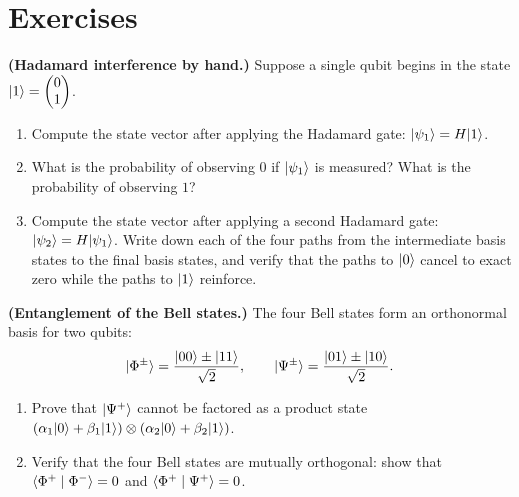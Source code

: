 \section*{Exercises}

\begin{exercise}\label{ch42:ex-hadamard-trace}
\textbf{(Hadamard interference by hand.)}
Suppose a single qubit begins in the state $\lvert 1 \rangle = \begin{pmatrix}0\\1\end{pmatrix}$.
\begin{enumerate}
  \item Compute the state vector after applying the Hadamard gate: $\lvert \psi_1 \rangle = H\lvert 1 \rangle$.
  \item What is the probability of observing $0$ if $\lvert \psi_1 \rangle$ is measured? What is the probability of observing $1$?
  \item Compute the state vector after applying a second Hadamard gate: $\lvert \psi_2 \rangle = H\lvert \psi_1 \rangle$. Write down each of the four paths from the intermediate basis states to the final basis states, and verify that the paths to $\lvert 0 \rangle$ cancel to exact zero while the paths to $\lvert 1 \rangle$ reinforce.
\end{enumerate}
\end{exercise}

\begin{exercise}\label{ch42:ex-bell-factorization}
\textbf{(Entanglement of the Bell states.)}
The four Bell states form an orthonormal basis for two qubits:
\[
  \lvert \Phi^\pm \rangle = \frac{\lvert 00 \rangle \pm \lvert 11 \rangle}{\sqrt{2}}, \qquad
  \lvert \Psi^\pm \rangle = \frac{\lvert 01 \rangle \pm \lvert 10 \rangle}{\sqrt{2}}.
\]
\begin{enumerate}
  \item Prove that $\lvert \Psi^+ \rangle$ cannot be factored as a product state
  $(\alpha_1\lvert 0 \rangle + \beta_1\lvert 1 \rangle) \otimes (\alpha_2\lvert 0 \rangle + \beta_2\lvert 1 \rangle)$.
  \item Verify that the four Bell states are mutually orthogonal: show that
  $\langle \Phi^+ \mid \Phi^- \rangle = 0$ and $\langle \Phi^+ \mid \Psi^+ \rangle = 0$.
\end{enumerate}
\end{exercise}

